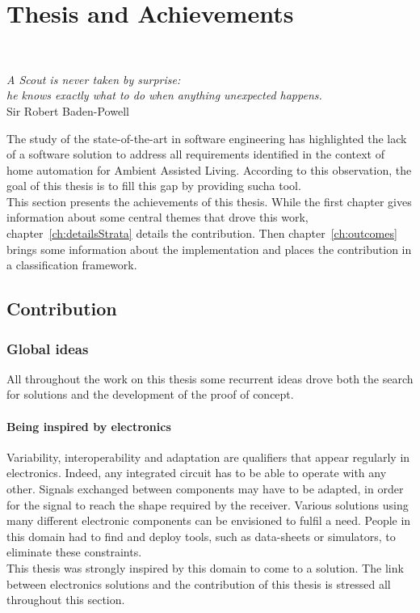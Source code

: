 \part{Thesis and Achievements}

~\vspace{1cm}
\begin{flushright}
{\it A Scout is never taken by surprise: \\
he knows exactly what to do when anything unexpected happens.} \\ 
Sir Robert Baden-Powell
\end{flushright}
\vspace{2cm}

The study of the state-of-the-art in software engineering has highlighted the lack of a software solution to address all requirements identified in the context of home automation for Ambient Assisted Living. According to this observation, the goal of this thesis is to fill this gap by providing sucha tool.\\

This section presents the achievements of this thesis. While the first chapter gives information about some central themes that drove this work, chapter~\ref{ch:detailsStrata} details the contribution. Then chapter~\ref{ch:outcomes} brings some information about the implementation and places the contribution in a classification framework.

\chapter{Contribution}


\section{Global ideas}

All throughout the work on this thesis some recurrent ideas drove both the search for solutions and the development of the proof of concept.

\subsection{Being inspired by electronics}

Variability, interoperability and adaptation are qualifiers that appear regularly in electronics. Indeed, any integrated circuit has to be able to operate with any other. Signals exchanged between components may have to be adapted, in order for the signal to reach the shape required by the receiver. Various solutions using many different electronic components can be envisioned to fulfil a need. People in this domain had to find and deploy tools, such as data-sheets or simulators, to eliminate these constraints.\\
This thesis was strongly inspired by this domain to come to a solution. The link between electronics solutions and the contribution of this thesis is stressed all throughout this section.

